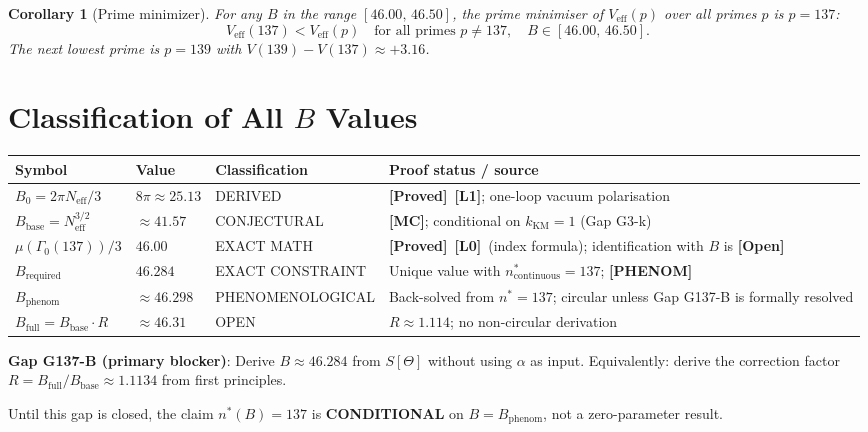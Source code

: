 \documentclass[12pt,a4paper]{article}
\newtheorem{corollary}[theorem]{Corollary}
\theoremstyle{definition}
\theoremstyle{remark}
\newcommand{\PROVED}{\textbf{[Proved]}}
\newcommand{\OPEN}{\textbf{[Open]}}
\newcommand{\MC}{\textbf{[MC]}}
\newcommand{\Lone}{\textbf{[L1]}}
\newcommand{\Lzero}{\textbf{[L0]}}
\newcommand{\PHENOM}{\textbf{[PHENOM]}}
\begin{document}
\begin{corollary}[Prime minimizer]
For any $B$ in the range $[46.00,\,46.50]$, the prime minimiser of
$V_{\mathrm{eff}}(p)$ over all primes $p$ is $p = 137$:
\begin{equation}
  V_{\mathrm{eff}}(137) < V_{\mathrm{eff}}(p)
  \quad\text{for all primes } p \neq 137,\quad B \in [46.00,\,46.50].
  \label{eq:vc:prime_min}
\end{equation}
The next lowest prime is $p = 139$ with $V(139) - V(137) \approx +3.16$.
\end{corollary}

\section{Classification of All $B$ Values}
\label{sec:vc:B_class}

\begin{center}
\renewcommand{\arraystretch}{1.3}
\begin{tabular}{p{3.8cm} p{1.8cm} p{3.5cm} p{3.8cm}}
\toprule
\textbf{Symbol} & \textbf{Value} & \textbf{Classification} & \textbf{Proof status / source} \\
\midrule
$B_0 = 2\pi N_{\mathrm{eff}}/3$ & $8\pi\approx 25.13$ & DERIVED & \PROVED~\Lone; one-loop vacuum polarisation \\
$B_{\mathrm{base}} = N_{\mathrm{eff}}^{3/2}$ & $\approx 41.57$ & CONJECTURAL & \MC; conditional on $k_{\mathrm{KM}}=1$ (Gap G3-k) \\
$\mu(\Gamma_0(137))/3$ & $46.00$ & EXACT MATH & \PROVED~\Lzero\ (index formula); identification with $B$ is \OPEN \\
$B_{\mathrm{required}}$ & $46.284$ & EXACT CONSTRAINT & Unique value with $n^*_{\mathrm{continuous}}=137$; \PHENOM \\
$B_{\mathrm{phenom}}$ & $\approx 46.298$ & PHENOMENOLOGICAL & Back-solved from $n^*=137$; circular unless Gap G137-B is formally resolved \\
$B_{\mathrm{full}} = B_{\mathrm{base}}\cdot R$ & $\approx 46.31$ & OPEN & $R\approx 1.114$; no non-circular derivation \\
\bottomrule
\end{tabular}
\end{center}

\begin{gapbox}
\textbf{Gap G137-B (primary blocker)}:
Derive $B \approx 46.284$ from $S[\Theta]$ without using $\alpha$ as input.
Equivalently: derive the correction factor $R = B_{\mathrm{full}}/B_{\mathrm{base}}
\approx 1.1134$ from first principles.

Until this gap is closed, the claim $n^*(B) = 137$ is \textbf{CONDITIONAL}
on $B = B_{\mathrm{phenom}}$, not a zero-parameter result.
\end{gapbox}
\end{document}
